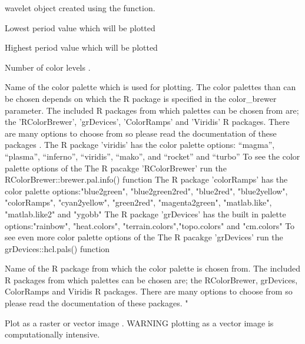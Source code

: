\documentclass[a4paper]{book}
\begin{document}
%
\begin{Arguments}
\begin{ldescription}
\item[\code{wavelet}] wavelet object created using the  function.

\item[\code{lowerPeriod}] Lowest period value which will be plotted

\item[\code{upperPeriod}] Highest period value which will be plotted

\item[\code{n.levels}] Number of color levels .

\item[\code{palette\_name}] Name of the color palette which is used for plotting.
The color palettes than can be chosen depends on which the R package is specified in
the color\_brewer parameter. The included R packages from which palettes can be chosen
from are; the 'RColorBrewer', 'grDevices', 'ColorRamps' and 'Viridis' R packages.
There are many options to choose from so please
read the documentation of these packages .
The R package 'viridis' has the color palette options: “magma”, “plasma”,
“inferno”, “viridis”, “mako”, and “rocket”  and “turbo”
To see the color palette options of the The R pacakge 'RColorBrewer' run
the RColorBrewer::brewer.pal.info() function
The R package 'colorRamps' has the color palette options:"blue2green",
"blue2green2red", "blue2red",    "blue2yellow", "colorRamps",    "cyan2yellow",
"green2red", "magenta2green", "matlab.like", "matlab.like2" and    "ygobb"
The R package 'grDevices' has the built in  palette options:"rainbow",
"heat.colors", "terrain.colors","topo.colors" and "cm.colors"
To see even more color palette options of the The R pacakge 'grDevices' run
the grDevices::hcl.pals() function

\item[\code{color\_brewer}] Name of the R package from which the color palette is chosen from.
The included R packages from which palettes can be chosen
are; the RColorBrewer, grDevices, ColorRamps and Viridis R packages.
There are many options to choose from so please
read the documentation of these packages. "

\item[\code{useRaster}] Plot as a raster or vector image .
WARNING plotting as a vector image is computationally intensive.


\end{ldescription}
\end{Arguments}
\end{document}
